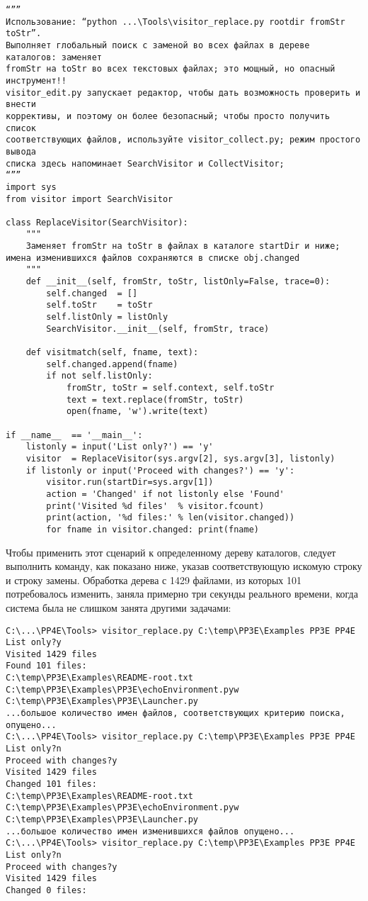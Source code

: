 \documentclass[12pt]{article}
\begin{document}
\begin{verbatim}
“””
Использование: “python ...\Tools\visitor_replace.py rootdir fromStr toStr”.
Выполняет глобальный поиск с заменой во всех файлах в дереве каталогов: заменяет
fromStr на toStr во всех текстовых файлах; это мощный, но опасный инструмент!!
visitor_edit.py запускает редактор, чтобы дать возможность проверить и внести
коррективы, и поэтому он более безопасный; чтобы просто получить список
соответствующих файлов, используйте visitor_collect.py; режим простого вывода
списка здесь напоминает SearchVisitor и CollectVisitor;
“””
import sys
from visitor import SearchVisitor

class ReplaceVisitor(SearchVisitor):
    """
    Заменяет fromStr на toStr в файлах в каталоге startDir и ниже;
имена изменившихся файлов сохраняются в списке obj.changed
    """
    def __init__(self, fromStr, toStr, listOnly=False, trace=0):
        self.changed  = []
        self.toStr    = toStr
        self.listOnly = listOnly
        SearchVisitor.__init__(self, fromStr, trace)

    def visitmatch(self, fname, text):
        self.changed.append(fname)
        if not self.listOnly:
            fromStr, toStr = self.context, self.toStr
            text = text.replace(fromStr, toStr)
            open(fname, 'w').write(text)

if __name__  == '__main__':
    listonly = input('List only?') == 'y'
    visitor  = ReplaceVisitor(sys.argv[2], sys.argv[3], listonly)
    if listonly or input('Proceed with changes?') == 'y':
        visitor.run(startDir=sys.argv[1])
        action = 'Changed' if not listonly else 'Found'
        print('Visited %d files'  % visitor.fcount)
        print(action, '%d files:' % len(visitor.changed))
        for fname in visitor.changed: print(fname)
\end{verbatim}
Чтобы применить этот сценарий к определенному дереву каталогов, следует выполнить команду, как показано ниже, указав соответствующую искомую строку и строку замены. Обработка дерева с 1429 файлами, из которых 101 потребовалось изменить, заняла примерно три секунды реального времени, когда сис­тема
была не слишком занята другими задачами:
\begin{verbatim}
C:\...\PP4E\Tools> visitor_replace.py C:\temp\PP3E\Examples PP3E PP4E
List only?y
Visited 1429 files
Found 101 files:
C:\temp\PP3E\Examples\README-root.txt
C:\temp\PP3E\Examples\PP3E\echoEnvironment.pyw
C:\temp\PP3E\Examples\PP3E\Launcher.py
...большое количество имен файлов, соответствующих критерию поиска,
опущено...
C:\...\PP4E\Tools> visitor_replace.py C:\temp\PP3E\Examples PP3E PP4E
List only?n
Proceed with changes?y
Visited 1429 files
Changed 101 files:
C:\temp\PP3E\Examples\README-root.txt
C:\temp\PP3E\Examples\PP3E\echoEnvironment.pyw
C:\temp\PP3E\Examples\PP3E\Launcher.py
...большое количество имен изменившихся файлов опущено...
C:\...\PP4E\Tools> visitor_replace.py C:\temp\PP3E\Examples PP3E PP4E
List only?n
Proceed with changes?y
Visited 1429 files
Changed 0 files:
\end{verbatim}
\end{document}
